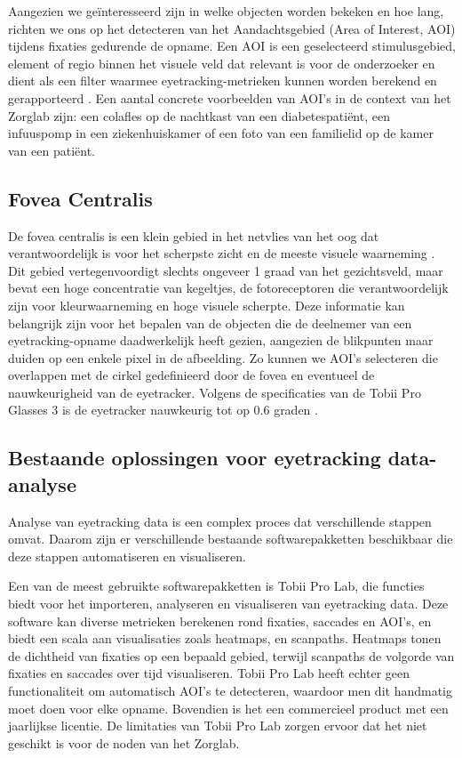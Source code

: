 Aangezien we geïnteresseerd zijn in welke objecten worden bekeken en hoe lang, richten we ons op het detecteren van het Aandachtsgebied (Area of Interest, AOI) tijdens fixaties gedurende de opname.
Een AOI is een geselecteerd stimulusgebied, element of regio binnen het visuele veld dat relevant is voor de onderzoeker en dient als een filter waarmee eyetracking-metrieken kunnen worden berekend en gerapporteerd \autocite{Pauszek2023}.
Een aantal concrete voorbeelden van AOI's in de context van het Zorglab zijn: een colafles op de nachtkast van een diabetespatiënt, een infuuspomp in een ziekenhuiskamer of een foto van een familielid op de kamer van een patiënt.

\subsection{Fovea Centralis}
\label{sec:fovea-centralis}

De fovea centralis is een klein gebied in het netvlies van het oog dat verantwoordelijk is voor het 
scherpste zicht en de meeste visuele waarneming \autocite{Remington2012}.
Dit gebied vertegenvoordigt slechts ongeveer 1 graad van het gezichtsveld, maar bevat een hoge concentratie van kegeltjes, 
de fotoreceptoren die verantwoordelijk zijn voor kleurwaarneming en hoge visuele scherpte.
Deze informatie kan belangrijk zijn voor het bepalen van de objecten die de deelnemer van een eyetracking-opname daadwerkelijk heeft gezien,
aangezien de blikpunten maar duiden op een enkele pixel in de afbeelding. 
Zo kunnen we AOI's selecteren die overlappen met de cirkel gedefinieerd door de fovea en eventueel de nauwkeurigheid van de eyetracker.
Volgens de specificaties van de Tobii Pro Glasses 3 is de eyetracker nauwkeurig tot op 0.6 graden \autocite{Tobii2025a}.

\subsection{Bestaande oplossingen voor eyetracking data-analyse}

Analyse van eyetracking data is een complex proces dat verschillende stappen omvat. Daarom zijn er verschillende bestaande softwarepakketten beschikbaar die deze stappen automatiseren en visualiseren.

Een van de meest gebruikte softwarepakketten is Tobii Pro Lab, die functies biedt voor het importeren, analyseren en visualiseren van eyetracking data.
Deze software kan diverse metrieken \autocite{Tobii2025b} berekenen rond fixaties, 
saccades en AOI's, en biedt een scala aan visualisaties \autocite{Tobii2025c} zoals heatmaps, en scanpaths.
Heatmaps tonen de dichtheid van fixaties op een bepaald gebied, terwijl scanpaths de volgorde van fixaties en saccades over tijd visualiseren.
Tobii Pro Lab heeft echter geen functionaliteit om automatisch AOI's te detecteren, waardoor men dit handmatig moet doen voor elke opname.
Bovendien is het een commercieel product met een jaarlijkse licentie.
De limitaties van Tobii Pro Lab zorgen ervoor dat het niet geschikt is voor de noden van het Zorglab.

